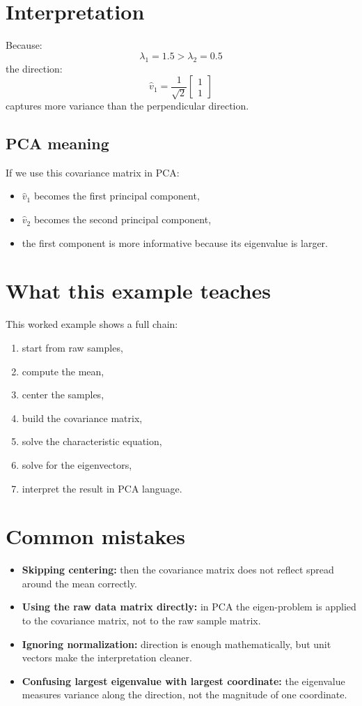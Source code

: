 \documentclass[11pt]{article}
\begin{document}
\section{Interpretation}
Because:
\[
  \lambda_1 = 1.5 > \lambda_2 = 0.5
\]
the direction:
\[
  \hat v_1 =
  \frac{1}{\sqrt{2}}
  \begin{bmatrix}
    1\\1
  \end{bmatrix}
\]
captures more variance than the perpendicular direction.

\subsection{PCA meaning}
If we use this covariance matrix in PCA:
\begin{itemize}[leftmargin=*]
  \item $\hat v_1$ becomes the first principal component,
  \item $\hat v_2$ becomes the second principal component,
  \item the first component is more informative because its eigenvalue is larger.
\end{itemize}

\section{What this example teaches}
This worked example shows a full chain:
\begin{enumerate}[leftmargin=*]
  \item start from raw samples,
  \item compute the mean,
  \item center the samples,
  \item build the covariance matrix,
  \item solve the characteristic equation,
  \item solve for the eigenvectors,
  \item interpret the result in PCA language.
\end{enumerate}

\section{Common mistakes}
\begin{itemize}[leftmargin=*]
  \item \textbf{Skipping centering:} then the covariance matrix does not reflect spread around the mean correctly.
  \item \textbf{Using the raw data matrix directly:} in PCA the eigen-problem is applied to the covariance matrix, not to the raw sample matrix.
  \item \textbf{Ignoring normalization:} direction is enough mathematically, but unit vectors make the interpretation cleaner.
  \item \textbf{Confusing largest eigenvalue with largest coordinate:} the eigenvalue measures variance along the direction, not the magnitude of one coordinate.
\end{itemize}
\end{document}
